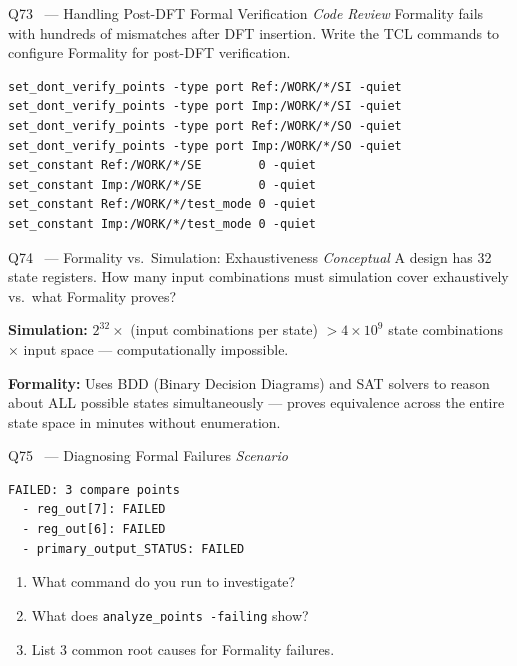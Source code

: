 \documentclass[12pt,a4paper]{article}
\newcommand{\advanced}{%
  \fbox{\textcolor{advred}{\bfseries\sffamily\small ADVANCED}}}
\newcommand{\moderate}{%
  \fbox{\textcolor{modoran}{\bfseries\sffamily\small MODERATE}}}
\begin{document}
\begin{questionbox}{Q73 \moderate\ --- Handling Post-DFT Formal Verification \hfill\textit{Code Review}}
Formality fails with hundreds of mismatches after DFT insertion. Write the TCL commands to configure Formality for post-DFT verification.
\end{questionbox}

\begin{answerbox}
\begin{lstlisting}[style=tclstyle]
set_dont_verify_points -type port Ref:/WORK/*/SI -quiet
set_dont_verify_points -type port Imp:/WORK/*/SI -quiet
set_dont_verify_points -type port Ref:/WORK/*/SO -quiet
set_dont_verify_points -type port Imp:/WORK/*/SO -quiet
set_constant Ref:/WORK/*/SE        0 -quiet
set_constant Imp:/WORK/*/SE        0 -quiet
set_constant Ref:/WORK/*/test_mode 0 -quiet
set_constant Imp:/WORK/*/test_mode 0 -quiet
\end{lstlisting}
\end{answerbox}

\begin{questionbox}{Q74 \advanced\ --- Formality vs.\ Simulation: Exhaustiveness \hfill\textit{Conceptual}}
A design has 32 state registers. How many input combinations must simulation cover exhaustively vs.\ what Formality proves?
\end{questionbox}

\begin{answerbox}
\textbf{Simulation:} $2^{32} \times$ (input combinations per state) $> 4\times10^9$ state combinations $\times$ input space --- computationally impossible.

\textbf{Formality:} Uses BDD (Binary Decision Diagrams) and SAT solvers to reason about ALL possible states simultaneously --- proves equivalence across the entire state space in minutes without enumeration.
\end{answerbox}

\begin{questionbox}{Q75 \advanced\ --- Diagnosing Formal Failures \hfill\textit{Scenario}}

\begin{lstlisting}[style=plaincode]
FAILED: 3 compare points
  - reg_out[7]: FAILED
  - reg_out[6]: FAILED
  - primary_output_STATUS: FAILED
\end{lstlisting}

\begin{enumerate}[label=\textbf{\alph*)}]
  \item What command do you run to investigate?
  \item What does \texttt{analyze\_points -failing} show?
  \item List 3 common root causes for Formality failures.
\end{enumerate}
\end{questionbox}
\end{document}
